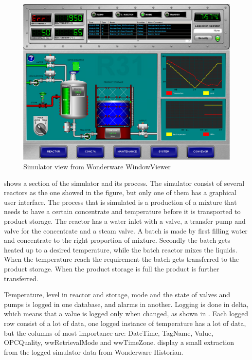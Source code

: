 \documentclass[english, a4paper]{report}
\begin{document}
{{{            \begin{figure}[H]
                \centering \includegraphics[width=1\textwidth]{Simulator}
                \caption{Simulator view from Wonderware WindowViewer}
                \label{fig:simulator_fig}
            \end{figure}
            
            \par
             shows a section of the simulator and its process. The simulator consist of several reactors as the one showed in the figure, but only one of them has a graphical user interface. The process that is simulated is a production of a mixture that needs to have a certain concentrate and temperature before it is transported to product storage. The reactor has a water inlet with a valve, a transfer pump and valve for the concentrate and a steam valve. A batch is made by first filling water and concentrate to the right proportion of mixture. Secondly the batch gets heated up to a desired temperature, while the batch reactor mixes the liquids. When the temperature reach the requirement the batch gets transferred to the product storage. When the product storage is full the product is further transferred. 
            \par 
            Temperature, level in reactor and storage, mode and the state of valves and pumps is logged in one database, and alarms in another. Logging is done in delta, which means that a value is logged only when changed, as shown in . Each logged row consist of a lot of data, one logged instance of temperature has a lot of data, but the columns of most importance are: DateTime, TagName, Value, OPCQuality, wwRetrievalMode and wwTimeZone.  display a small extraction from the logged simulator data from Wonderware Historian.
            
}}}
\end{document}
